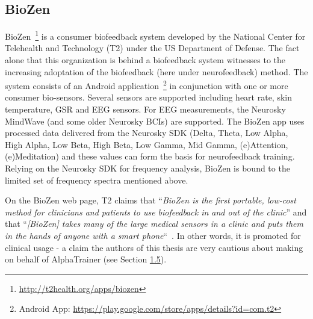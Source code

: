 \documentclass[a4paper,10pt,english,lof,lot,twoside]{puthesis}
\begin{document}
\subsection{BioZen}
\label{ch-background/index:biozen}\label{ch-background/index:ch-background-bio-zen}
BioZen \footnote{
\href{http://t2health.org/apps/biozen}{http://t2health.org/apps/biozen}
} is a consumer biofeedback system
developed by the National Center for Telehealth and Technology (T2) under the US
Department of Defense. The fact alone that this organization is behind a
biofeedback system witnesses to the increasing adoptation of the biofeedback
(here under neurofeedback) method. The system consists of an Android application \footnote{
Android App: \href{https://play.google.com/store/apps/details?id=com.t2}{https://play.google.com/store/apps/details?id=com.t2}
} in conjunction with one or more consumer
bio-sensors. Several sensors are supported including heart rate, skin
temperature, GSR and EEG sensors. For EEG measurements, the Neurosky MindWave
(and some older Neurosky BCIs) are supported. The BioZen app uses processed data
delivered from the Neurosky SDK (Delta, Theta, Low Alpha, High Alpha, Low Beta,
High Beta, Low Gamma, Mid Gamma, (e)Attention, (e)Meditation) and these values
can form the basis for neurofeedback training. Relying on the Neurosky SDK for
frequency analysis, BioZen is bound to the limited set of frequency spectra
mentioned above.

On the BioZen web page, T2 claims that ``\emph{BioZen is the first portable, low-cost
method for clinicians and patients to use biofeedback in and out of the clinic}''
and that ``\emph{{[}BioZen{]} takes many of the large medical sensors in a clinic and puts
them in the hands of anyone with a smart phone}`` \footnotemark[23]. In other words, it is promoted for clinical usage -
a claim the authors of this thesis are very cautious about making on behalf of
AlphaTrainer (see Section {\hyperref[ch-intro/index:ch-intro-limitations]{1.5}}).
\end{document}
